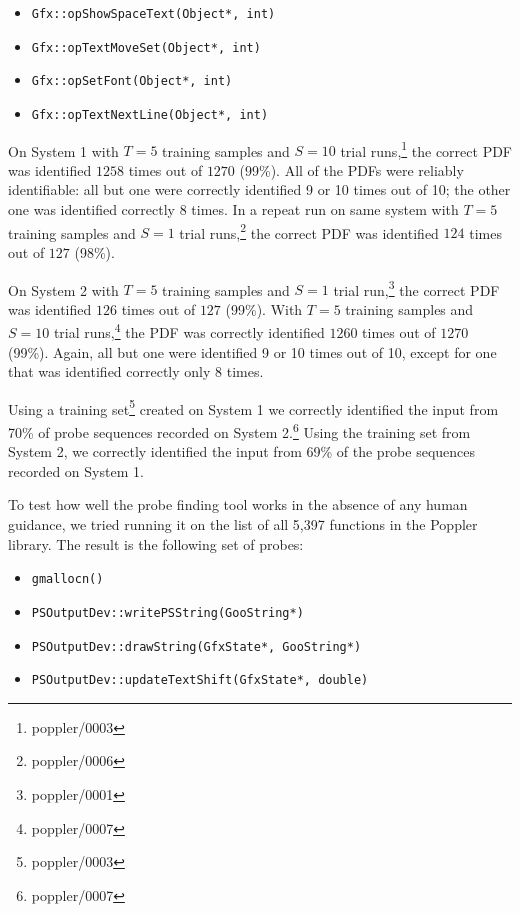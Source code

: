 \documentclass[letterpaper,twocolumn,10pt]{article}
\begin{document}
\begin{itemize}
\setlength{\itemsep}{0pt}
    \item \texttt{Gfx::opShowSpaceText(Object*, int)}
    \item \texttt{Gfx::opTextMoveSet(Object*, int)}
    \item \texttt{Gfx::opSetFont(Object*, int)}
    \item \texttt{Gfx::opTextNextLine(Object*, int)}
\end{itemize}

On System 1 with $T=5$ training samples and $S=10$ trial
runs,\footnote{poppler/0003} the correct PDF was identified $1258$ times out of
$1270$ (99\%). All of the PDFs were reliably identifiable: all but one were
correctly identified 9 or 10 times out of 10; the other one was identified
correctly 8 times. In a repeat run on same system with $T=5$ training samples
and $S=1$ trial runs,\footnote{poppler/0006} the correct PDF was identified
$124$ times out of $127$ (98\%).

On System 2 with $T=5$ training samples and $S=1$ trial
run,\footnote{poppler/0001} the correct PDF was identified $126$ times out of
$127$ (99\%). With $T=5$ training samples and $S=10$ trial
runs,\footnote{poppler/0007} the PDF was correctly identified $1260$ times out
of $1270$ (99\%). Again, all but one were identified 9 or 10 times out of 10,
except for one that was identified correctly only 8 times.

Using a training set\footnote{poppler/0003} created on System 1 we correctly
identified the input from 70\% of probe sequences recorded on System
2.\footnote{poppler/0007} Using the training set from System 2, we correctly
identified the input from 69\% of the probe sequences recorded on System 1.

To test how well the probe finding tool works in the absence of any human
guidance, we tried running it on the list of all 5,397 functions in the
Poppler library. The result is the following set of probes:

\begin{itemize}
\setlength{\itemsep}{0pt}
    \item \texttt{gmallocn()}
    \item \texttt{PSOutputDev::writePSString(GooString*)}
    \item \texttt{PSOutputDev::drawString(GfxState*, GooString*)}
    \item \texttt{PSOutputDev::updateTextShift(GfxState*, double)}
\end{itemize}
\end{document}

